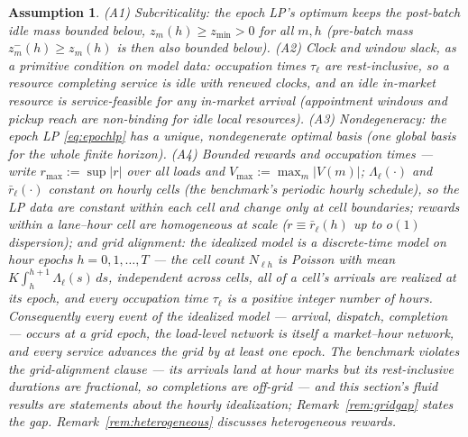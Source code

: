 \documentclass[11pt]{article}
\newtheorem{assumption}{Assumption}
\begin{document}
\begin{assumption}
\label{ass:regime}
(A1) Subcriticality: the epoch LP's optimum keeps the post-batch
idle mass bounded below, $z_m(h) \geq z_{\min} > 0$ for all $m, h$
(pre-batch mass $z^{-}_m(h) \geq z_m(h)$ is then also bounded
below). (A2) Clock and window slack, as a primitive condition
on model data: occupation times $\tau_{\ell}$ are rest-inclusive, so a
resource completing service is idle with renewed clocks, and an idle
in-market resource is service-feasible for any in-market arrival
(appointment windows and pickup reach are non-binding for idle local
resources). (A3) Nondegeneracy: the epoch LP \eqref{eq:epochlp} has a unique,
nondegenerate optimal basis (one global basis for the whole finite
horizon). (A4) Bounded rewards
and occupation times --- write $r_{\max} := \sup |r|$ over all
loads and $V_{\max} := \max_m |V(m)|$; $\Lambda_{\ell}(\cdot)$ and
$\bar{r}_{\ell}(\cdot)$ constant on hourly cells (the benchmark's
periodic hourly schedule), so the LP data are constant within each
cell and change only at cell boundaries; rewards within a
lane--hour cell are homogeneous at scale ($r \equiv \bar{r}_{\ell}(h)$
up to $o(1)$ dispersion); and \emph{grid alignment}: the idealized
model is a discrete-time model on hour epochs $h = 0, 1, \dots, T$
--- the cell count $N_{\ell h}$ is Poisson with mean
$K \int_h^{h+1} \Lambda_{\ell}(s)\, ds$, independent across cells,
all of a cell's arrivals are realized \emph{at} its epoch, and every
occupation time $\tau_{\ell}$ is a positive integer number of hours.
Consequently every event of the idealized model --- arrival,
dispatch, completion --- occurs at a grid epoch, the load-level
network is itself a market--hour network, and every service advances
the grid by at least one epoch. The benchmark violates the
grid-alignment clause --- its arrivals land at hour marks but its
rest-inclusive durations are fractional, so completions are off-grid
--- and this section's fluid results are statements about the hourly
idealization; Remark~\ref{rem:gridgap} states the gap.
Remark~\ref{rem:heterogeneous} discusses heterogeneous rewards.
\end{assumption}
\end{document}

